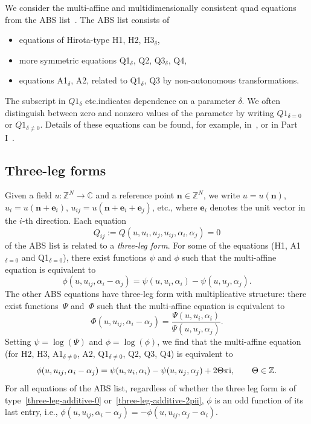 \documentclass[10pt,a4paper]{amsart}
\newcommand{\C}{\mathbb{C}}
\newcommand{\Z}{\mathbb{Z}}
\renewcommand{\vec}{\boldsymbol}
\numberwithin{equation}{section}
\begin{document}
We consider the multi-affine and multidimensionally consistent quad equations from the ABS list~\cite{adler2003classification}. The ABS list consists of
\begin{itemize}	\itemsep=0pt
 \item equations of Hirota-type H1, H2, H3$_{\delta}$,
 \item more symmetric equations Q1$_{\delta}$, Q2, Q3$_{\delta}$, Q4,
 \item equations A1$_{\delta}$, A2, related to Q1$_{\delta}$, Q3 by non-autonomous transformations.
\end{itemize}
The subscript in $Q1_{\delta}$ etc.\@ indicates dependence on a parameter $\delta$. We often distinguish between zero and nonzero values of the parameter by writing $Q1_{\delta=0}$ or $Q1_{\delta\neq0}$.
Details of these equations can be found, for example, in~\cite{adler2003classification, bobenko2010lagrangian, hietarinta2009soliton, nijhoff2009soliton}, or in Part I~\cite{richardson2025discrete1}.

\subsection{Three-leg forms}

Given a field $u\colon \Z^N \to \C$ and a reference point $\vec n \in \Z^N$, we write $u = u(\vec n)$, $u_i = u(\vec n + \vec e_i)$, $u_{ij} = u(\vec n + \vec e_i + \vec e_j)$, etc., where $\vec e_i$ denotes the unit vector in the $i$-th direction.
Each equation
\[ Q_{ij} := Q(u,u_i,u_j,u_{ij}, \alpha_i, \alpha_j) = 0\]
of the ABS list is related to a \emph{three-leg form}. For some of the equations (H1, A1$_{\delta=0}$ and Q1$_{\delta=0}$), there exist functions $\psi$ and $\phi$ such that the multi-affine equation is equivalent to
\begin{equation}
 \label{three-leg-additive-0}
 \phi(u,u_{ij}, \alpha_i-\alpha_j) = \psi(u,u_i,\alpha_i) - \psi(u,u_j,\alpha_j) .
\end{equation}
The other ABS equations have three-leg form with multiplicative structure: there exist functions~$\Psi$ and~$\Phi$ such that the multi-affine equation is equivalent to
\[ \Phi(u,u_{ij}, \alpha_i-\alpha_j) = \frac{ \Psi(u,u_i,\alpha_i) }{ \Psi(u,u_j,\alpha_j) } . \]
Setting $\psi = \log(\Psi)$ and $\phi = \log(\phi)$, we find that the multi-affine equation (for H2, H3, A1$_{\delta\neq0}$, A2, Q1$_{\delta\neq0}$, Q2, Q3, Q4) is equivalent to
\begin{equation}
 \label{three-leg-additive-2pii}
 \phi(u,u_{ij}, \alpha_i-\alpha_j) = \psi(u,u_i,\alpha_i) - \psi(u,u_j,\alpha_j) + 2 \Theta \pi {\rm i}, \qquad \Theta \in \Z .
\end{equation}
For all equations of the ABS list, regardless of whether the three leg form is of type~\eqref{three-leg-additive-0} or~\eqref{three-leg-additive-2pii}, $\phi$ is an odd function of its last entry, i.e., $\phi(u,u_{ij}, \alpha_i-\alpha_j) = - \phi(u,u_{ij}, \alpha_j-\alpha_i)$.
\end{document}
